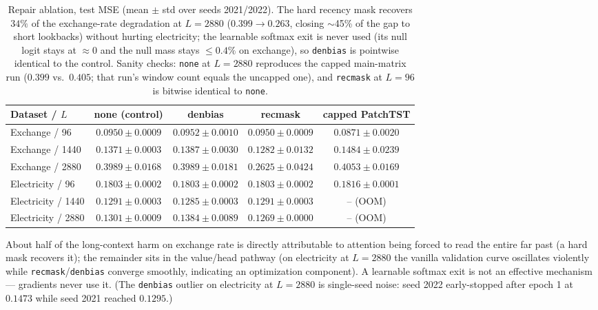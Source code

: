 \begin{table}[t]
\caption{Repair ablation, test MSE (mean $\pm$ std over seeds 2021/2022). The hard recency mask recovers $34\%$ of the exchange-rate degradation at $L{=}2880$ ($0.399 \to 0.263$, closing $\sim$45\% of the gap to short lookbacks) without hurting electricity; the learnable softmax exit is never used (its null logit stays at $\approx 0$ and the null mass stays $\le 0.4\%$ on exchange), so \texttt{denbias} is pointwise identical to the control. Sanity checks: \texttt{none} at $L{=}2880$ reproduces the capped main-matrix run ($0.399$ vs.\ $0.405$; that run's window count equals the uncapped one), and \texttt{recmask} at $L{=}96$ is bitwise identical to \texttt{none}.}
\label{tab:repair}
\centering\small
\begin{tabular}{lcccc}
\toprule
Dataset / $L$ & none (control) & denbias & recmask & capped PatchTST \\
\midrule
Exchange / 96 & $0.0950\pm0.0009$ & $0.0952\pm0.0010$ & $0.0950\pm0.0009$ & $0.0871\pm0.0020$ \\
Exchange / 1440 & $0.1371\pm0.0003$ & $0.1387\pm0.0030$ & $0.1282\pm0.0132$ & $0.1484\pm0.0239$ \\
Exchange / 2880 & $0.3989\pm0.0168$ & $0.3989\pm0.0181$ & $\mathbf{0.2625\pm0.0424}$ & $0.4053\pm0.0169$ \\
\midrule
Electricity / 96 & $0.1803\pm0.0002$ & $0.1803\pm0.0002$ & $0.1803\pm0.0002$ & $0.1816\pm0.0001$ \\
Electricity / 1440 & $0.1291\pm0.0003$ & $0.1285\pm0.0003$ & $0.1291\pm0.0003$ & -- (OOM) \\
Electricity / 2880 & $0.1301\pm0.0009$ & $0.1384\pm0.0089$ & $\mathbf{0.1269\pm0.0000}$ & -- (OOM) \\
\bottomrule
\end{tabular}
\end{table}

About half of the long-context harm on exchange rate is directly attributable to attention being forced to read the entire far past (a hard mask recovers it); the remainder sits in the value/head pathway (on electricity at $L{=}2880$ the vanilla validation curve oscillates violently while \texttt{recmask}/\texttt{denbias} converge smoothly, indicating an optimization component). A learnable softmax exit is not an effective mechanism --- gradients never use it. (The \texttt{denbias} outlier on electricity at $L{=}2880$ is single-seed noise: seed 2022 early-stopped after epoch 1 at $0.1473$ while seed 2021 reached $0.1295$.)
